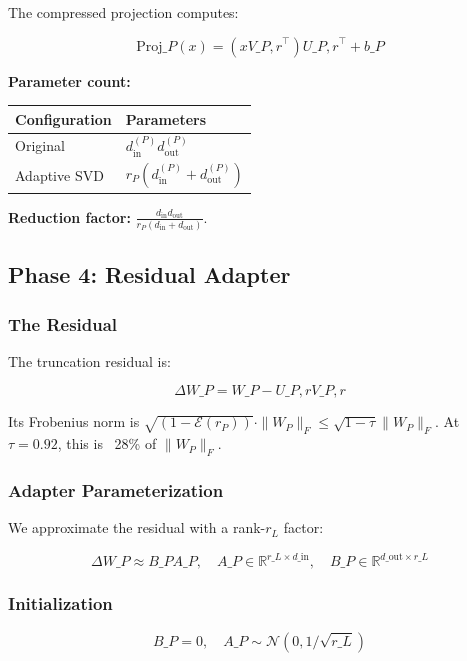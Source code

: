 The compressed projection computes:

\[
\text{Proj}\_P(x) = (x V\_{P, r}^\top) U\_{P, r}^\top + b\_P
\tag{4.5}
\]

\textbf{Parameter count:}

\begin{table}[H]
\centering
\small
\begin{tabular}{ll}
\toprule
\textbf{Configuration} & \textbf{Parameters} \\
\midrule
Original & $d_\text{in}^{(P)} d_\text{out}^{(P)}$ \\
Adaptive SVD & $r_P (d_\text{in}^{(P)} + d_\text{out}^{(P)})$ \\
\bottomrule
\end{tabular}
\end{table}

\textbf{Reduction factor:} $\frac{d_\text{in} d_\text{out}}{r_P (d_\text{in} + d_\text{out})}$.

\subsection{Phase 4: Residual Adapter}

\subsubsection{The Residual}

The truncation residual is:

\[
\Delta W\_P = W\_P - U\_{P, r} V\_{P, r}
\tag{4.6}
\]

Its Frobenius norm is $\sqrt{(1 - \mathcal{E}(r_P))} \cdot \|W_P\|_F \leq \sqrt{1 - \tau} \|W_P\|_F$. 
At $\tau = 0.92$, this is ~28\% of $\|W_P\|_F$.

\subsubsection{Adapter Parameterization}

We approximate the residual with a rank-$r_L$ factor:

\[
\Delta W\_P \approx B\_P A\_P, \quad
A\_P \in \mathbb{R}^{r\_L \times d\_\text{in}}, \quad
B\_P \in \mathbb{R}^{d\_\text{out} \times r\_L}
\tag{4.7}
\]

\subsubsection{Initialization}

\[
B\_P = 0, \quad A\_P \sim \mathcal{N}(0, 1/\sqrt{r\_L})
\tag{4.8}
\]

